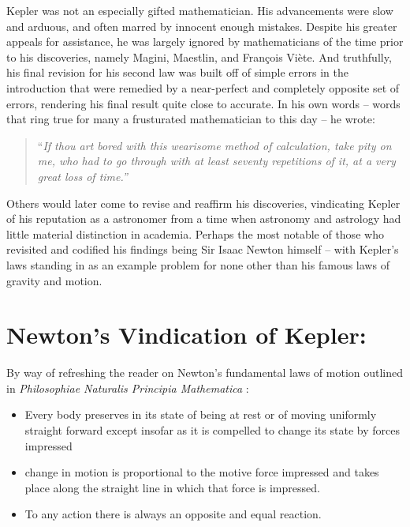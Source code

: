 \documentclass{article}
\begin{document}
Kepler was not an especially gifted mathematician. His advancements were slow and arduous, and often marred by innocent enough mistakes. Despite his greater appeals for assistance, he was largely ignored by mathematicians of the time prior to his discoveries, namely Magini, Maestlin, and François Viète. And truthfully, his final revision for his second law was built off of simple errors in the introduction that were remedied by a near-perfect and completely opposite set of errors, rendering his final result quite close to accurate. \cite{sleepwalker} In his own words -- words that ring true for many a frusturated mathematician to this day -- he wrote:

\begin{quote}
    “\textit{If thou art bored with this wearisome method of calculation, take pity on me, who had to go through with at least seventy repetitions of it, at a very great loss of time.”}
\end{quote}

Others would later come to revise and reaffirm his discoveries, vindicating Kepler of his reputation as a astronomer from a time when astronomy and astrology had little material distinction in academia. Perhaps the most notable of those who revisited and codified his findings being Sir Isaac Newton himself -- with Kepler's laws standing in as an example problem for none other than his famous laws of gravity and motion.


\section{Newton's Vindication of Kepler:}

By way of refreshing the reader on Newton's fundamental laws of motion outlined in \textit{Philosophiae Naturalis Principia Mathematica} \cite{newton}:

\begin{itemize}
    \item Every body preserves in its state of being at rest or of moving uniformly straight forward except insofar as it is compelled to change its state by forces impressed 
    \item change in motion is proportional to the motive force impressed and takes place along the straight line in which that force is impressed.
    \item To any action there is always an opposite and equal reaction.
\end{itemize}
\end{document}
